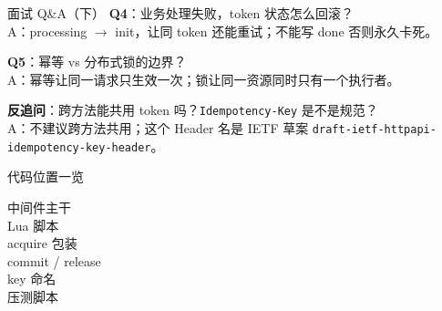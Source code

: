 \begin{frame}{面试 Q\&A（下）}
\textbf{Q4}：业务处理失败，token 状态怎么回滚？\\
\hspace{4mm}\small A：processing $\to$ init，让同 token 还能重试；不能写 done 否则永久卡死。

\vspace{2mm}
\textbf{Q5}：幂等 vs 分布式锁的边界？\\
\hspace{4mm}\small A：幂等让同一请求只生效一次；锁让同一资源同时只有一个执行者。

\vspace{2mm}
\textbf{反追问}：跨方法能共用 token 吗？\texttt{Idempotency-Key} 是不是规范？\\
\hspace{4mm}\small A：不建议跨方法共用；这个 Header 名是 IETF 草案 \texttt{draft-ietf-httpapi-idempotency-key-header}。
\end{frame}

\begin{frame}{代码位置一览}
\begin{description}
  \item[中间件主干]
  \item[Lua 脚本]
  \item[acquire 包装]
  \item[commit / release]
  \item[key 命名]
  \item[压测脚本]
\end{description}
\vspace{3mm}
\end{frame}


